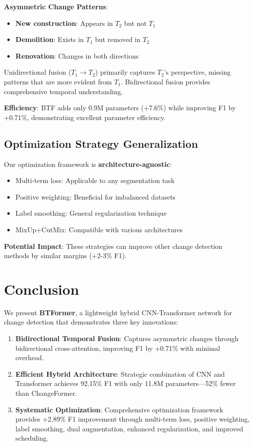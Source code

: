 \documentclass[journal]{IEEEtran}
\begin{document}
\textbf{Asymmetric Change Patterns}:
\begin{itemize}
    \item \textbf{New construction}: Appears in $T_2$ but not $T_1$
    \item \textbf{Demolition}: Exists in $T_1$ but removed in $T_2$
    \item \textbf{Renovation}: Changes in both directions
\end{itemize}

Unidirectional fusion ($T_1 \rightarrow T_2$) primarily captures $T_2$'s perspective, missing patterns that are more evident from $T_1$. Bidirectional fusion provides comprehensive temporal understanding.

\textbf{Efficiency}: BTF adds only 0.9M parameters (+7.6\%) while improving F1 by +0.71\%, demonstrating excellent parameter efficiency.

\subsection{Optimization Strategy Generalization}

Our optimization framework is \textbf{architecture-agnostic}:
\begin{itemize}
    \item Multi-term loss: Applicable to any segmentation task
    \item Positive weighting: Beneficial for imbalanced datasets
    \item Label smoothing: General regularization technique
    \item MixUp+CutMix: Compatible with various architectures
\end{itemize}

\textbf{Potential Impact}: These strategies can improve other change detection methods by similar margins (+2-3\% F1).

\section{Conclusion}

We present \textbf{BTFormer}, a lightweight hybrid CNN-Transformer network for change detection that demonstrates three key innovations:

\begin{enumerate}
    \item \textbf{Bidirectional Temporal Fusion}: Captures asymmetric changes through bidirectional cross-attention, improving F1 by +0.71\% with minimal overhead.
    
    \item \textbf{Efficient Hybrid Architecture}: Strategic combination of CNN and Transformer achieves 92.15\% F1 with only 11.8M parameters—52\% fewer than ChangeFormer.
    
    \item \textbf{Systematic Optimization}: Comprehensive optimization framework provides +2.89\% F1 improvement through multi-term loss, positive weighting, label smoothing, dual augmentation, enhanced regularization, and improved scheduling.
\end{enumerate}
\end{document}
